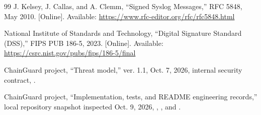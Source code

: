 \documentclass[conference]{IEEEtran}
\begin{document}
\begin{thebibliography}{99}
 J. Kelsey, J. Callas, and A. Clemm, ``Signed Syslog Messages,'' RFC 5848, May 2010. [Online]. Available: \url{https://www.rfc-editor.org/rfc/rfc5848.html}

 National Institute of Standards and Technology, ``Digital Signature Standard (DSS),'' FIPS PUB 186-5, 2023. [Online]. Available: \url{https://csrc.nist.gov/pubs/fips/186-5/final}

 ChainGuard project, ``Threat model,'' ver. 1.1, Oct. 7, 2026, internal security contract, .

 ChainGuard project, ``Implementation, tests, and README engineering records,'' local repository snapshot inspected Oct. 9, 2026, , , and .

\end{thebibliography}
\end{document}
